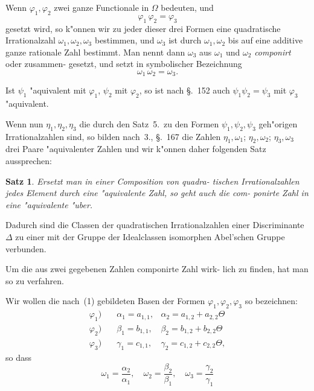 \documentclass[12pt,a4paper]{article}
\theoremstyle{weber}
\newtheorem*{satz}{Satz}
\begin{document}
Wenn $\varphi_1, \varphi_2$ zwei ganze Functionale in $\varOmega$ bedeuten, und
\[
\varphi_1\,\varphi_2 = \varphi_3
\]
gesetzt wird, so k"onnen wir zu jeder dieser drei Formen eine
quadratische Irrationalzahl $\omega_1, \omega_2, \omega_3$ bestimmen, und $\omega_3$ ist
durch $\omega_1, \omega_2$ bis auf eine additive ganze rationale Zahl bestimmt.
Man nennt dann $\omega_3$ aus $\omega_1$ und $\omega_2$ \emph{componirt} oder zusammen-
gesetzt, und setzt in symbolischer Bezeichnung
\begin{equation}\label{eq:s168-3}
\omega_1\,\omega_2 = \omega_3.
\end{equation}

Ist $\psi_1$ "aquivalent mit $\varphi_1$, $\psi_2$ mit $\varphi_2$, so ist nach \S.~152 auch
$\psi_1\psi_2 = \psi_3$ mit $\varphi_3$ "aquivalent.

Wenn nun $\eta_1, \eta_2, \eta_3$ die durch den Satz~5.\ zu den Formen
$\psi_1, \psi_2, \psi_3$ geh"origen Irrationalzahlen sind, so bilden nach~3.,
\S.~167 die Zahlen $\eta_1, \omega_1$; $\eta_2, \omega_2$; $\eta_3, \omega_3$ drei Paare "aquivalenter
Zahlen und wir k"onnen daher folgenden Satz aussprechen:

\begin{satz}
Ersetzt man in einer Composition von quadra-
tischen Irrationalzahlen jedes Element durch
eine "aquivalente Zahl, so geht auch die com-
ponirte Zahl in eine "aquivalente "uber.
\end{satz}

Dadurch sind die Classen der quadratischen Irrationalzahlen
einer Discriminante $\varDelta$ zu einer mit der Gruppe der Idealclassen
isomorphen Abel'schen Gruppe verbunden.

Um die aus zwei gegebenen Zahlen componirte Zahl wirk-
lich zu finden, hat man so zu verfahren.

Wir wollen die nach~(1) gebildeten Basen der Formen
$\varphi_1, \varphi_2, \varphi_3$ so bezeichnen:
\[
\begin{array}{lll}
\varphi_1)\quad & \alpha_1 = a_{1,1}, & \alpha_2 = a_{1,2} + a_{2,2}\varTheta \\
\varphi_2)\quad & \beta_1 = b_{1,1}, & \beta_2 = b_{1,2} + b_{2,2}\varTheta \\
\varphi_3)\quad & \gamma_1 = c_{1,1}, & \gamma_2 = c_{1,2} + c_{2,2}\varTheta,
\end{array}
\]
so dass
\[
\omega_1 = \frac{\alpha_2}{\alpha_1}, \quad \omega_2 = \frac{\beta_2}{\beta_1}, \quad \omega_3 = \frac{\gamma_2}{\gamma_1}
\]
\end{document}
